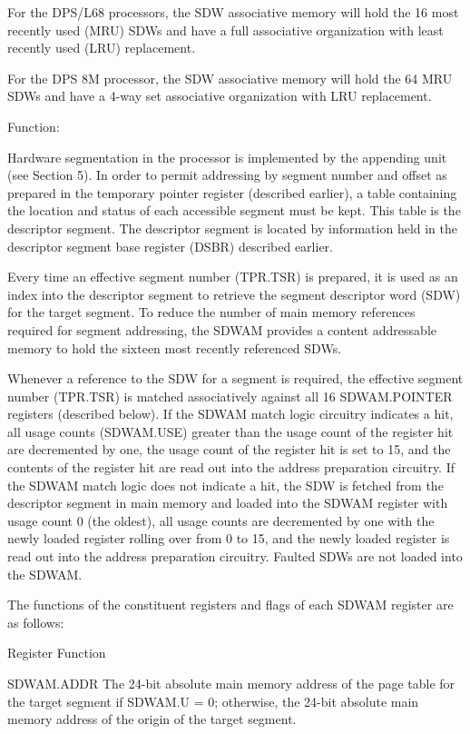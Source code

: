 For the DPS/L68 processors, the SDW associative memory will hold the 16 most
recently used (MRU) SDWs and have a full associative organization with least
recently used (LRU) replacement.

For the DPS 8M processor, the SDW associative memory will hold the 64 MRU SDWs
and have a 4-way set associative organization with LRU replacement.

Function:

Hardware segmentation in the processor is implemented by the appending unit
(see Section 5). In order to permit addressing by segment number and offset as
prepared in the temporary pointer register (described earlier), a table
containing the location and status of each accessible segment must be kept.
This table is the descriptor segment. The descriptor segment is located by
information held in the descriptor segment base register (DSBR) described
earlier.

Every time an effective segment number (TPR.TSR) is prepared, it is used as an
index into the descriptor segment to retrieve the segment descriptor word (SDW)
for the target segment. To reduce the number of main memory references required
for segment addressing, the SDWAM provides a content addressable memory to hold
the sixteen most recently referenced SDWs.

Whenever a reference to the SDW for a segment is required, the effective
segment number (TPR.TSR) is matched associatively against all 16 SDWAM.POINTER
registers (described below). If the SDWAM match logic circuitry indicates a
hit, all usage counts (SDWAM.USE) greater than the usage count of the register
hit are decremented by one, the usage count of the register hit is set to 15,
and the contents of the register hit are read out into the address preparation
circuitry. If the SDWAM match logic does not indicate a hit, the SDW is fetched
from the descriptor segment in main memory and loaded into the SDWAM register
with usage count 0 (the oldest), all usage counts are decremented by one with
the newly loaded register rolling over from 0 to 15, and the newly loaded
register is read out into the address preparation circuitry. Faulted SDWs are
not loaded into the SDWAM.

The functions of the constituent registers and flags of each SDWAM register are
as follows:

Register Function

SDWAM.ADDR The 24-bit absolute main memory address of the page table for the
target segment if SDWAM.U = 0; otherwise, the 24-bit absolute main memory
address of the origin of the target segment.

